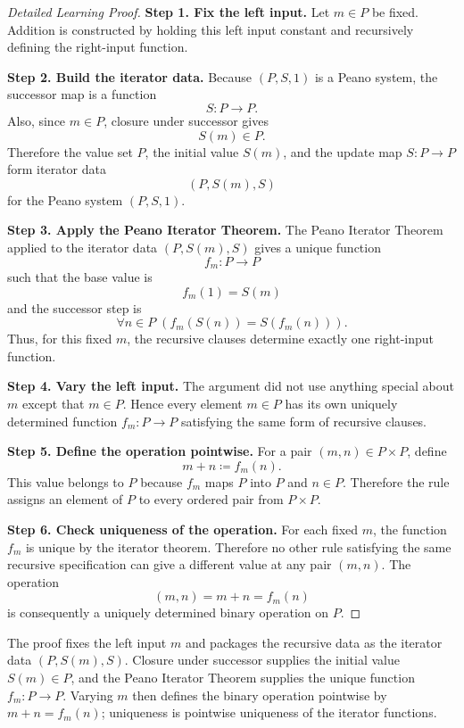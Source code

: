 \begin{proof}[Detailed Learning Proof]
\LRAProofBodyStart
\textbf{Step 1. Fix the left input.}
Let $m\in P$ be fixed. Addition is constructed by holding this left input
constant and recursively defining the right-input function.

\textbf{Step 2. Build the iterator data.}
Because $(P,S,1)$ is a Peano system, the successor map is a function
\[
S:P\to P.
\]
Also, since $m\in P$, closure under successor gives
\[
S(m)\in P.
\]
Therefore the value set $P$, the initial value $S(m)$, and the update map
$S:P\to P$ form iterator data
\[
(P,S(m),S)
\]
for the Peano system $(P,S,1)$.

\textbf{Step 3. Apply the Peano Iterator Theorem.}
The Peano Iterator Theorem applied to the iterator data $(P,S(m),S)$ gives a
unique function
\[
f_m:P\to P
\]
such that the base value is
\[
f_m(1)=S(m)
\]
and the successor step is
\[
\forall n\in P\;(f_m(S(n))=S(f_m(n))).
\]
Thus, for this fixed $m$, the recursive clauses determine exactly one
right-input function.

\textbf{Step 4. Vary the left input.}
The argument did not use anything special about $m$ except that $m\in P$.
Hence every element $m\in P$ has its own uniquely determined function
$f_m:P\to P$ satisfying the same form of recursive clauses.

\textbf{Step 5. Define the operation pointwise.}
For a pair $(m,n)\in P\times P$, define
\[
m+n\coloneqq f_m(n).
\]
This value belongs to $P$ because $f_m$ maps $P$ into $P$ and $n\in P$.
Therefore the rule assigns an element of $P$ to every ordered pair from
$P\times P$.

\textbf{Step 6. Check uniqueness of the operation.}
For each fixed $m$, the function $f_m$ is unique by the iterator theorem.
Therefore no other rule satisfying the same recursive specification can give
a different value at any pair $(m,n)$. The operation
\[
(m,n)=m+n=f_m(n)
\]
is consequently a uniquely determined binary operation on $P$.
\end{proof}

\begin{remark*}
The proof fixes the left input $m$ and packages the recursive data as the
iterator data $(P,S(m),S)$. Closure under successor supplies the initial value
$S(m)\in P$, and the Peano Iterator Theorem supplies the unique function
$f_m:P\to P$. Varying $m$ then defines the binary operation pointwise by
$m+n=f_m(n)$; uniqueness is pointwise uniqueness of the iterator functions.
\end{remark*}

